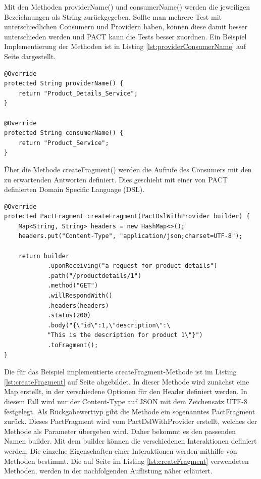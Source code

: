 \documentclass{llncs}
\begin{document}
Mit den Methoden providerName() und consumerName() werden die jeweiligen Bezeichnungen als String zurückgegeben. Sollte man mehrere Test mit unterschiedlichen Consumern und Providern haben, können diese damit besser unterschieden werden und PACT kann die Tests besser zuordnen. Ein Beispiel Implementierung der Methoden ist in Listing \ref{lst:providerConsumerName} auf Seite  \pageref{lst:providerConsumerName} dargestellt.
\lstset{language = Java}
\begin{lstlisting}[caption=Implementierung von providerName() und consumerName(),label=lst:providerConsumerName]
@Override
protected String providerName() {
    return "Product_Details_Service";
}

@Override
protected String consumerName() {
    return "Product_Service";
}
\end{lstlisting}

Über die Methode createFragment() werden die Aufrufe des Consumers mit den zu erwartenden Antworten definiert. Dies geschieht mit einer von PACT definierten Domain Specific Language (DSL).
\lstset{language = Java}
\begin{lstlisting}[caption=Implementierung createFragment(),label=lst:createFragment]
@Override
protected PactFragment createFragment(PactDslWithProvider builder) {
    Map<String, String> headers = new HashMap<>();
    headers.put("Content-Type", "application/json;charset=UTF-8");
        
    return builder
            .uponReceiving("a request for product details")
            .path("/productdetails/1")
            .method("GET")
            .willRespondWith()
            .headers(headers)
            .status(200)
            .body("{\"id\":1,\"description\":\
            "This is the description for product 1\"}")
            .toFragment();
}
\end{lstlisting}
Die für das Beispiel implementierte createFragment-Methode ist im Listing \ref{lst:createFragment} auf Seite \pageref{lst:createFragment} abgebildet. In dieser Methode wird zunächst eine Map erstellt, in der verschiedene Optionen für den Header definiert werden. In diesem Fall wird nur der Content-Type auf JSON mit dem Zeichensatz UTF-8 festgelegt. Als Rückgabewerttyp gibt die Methode ein sogenanntes PactFragment zurück. Dieses PactFragment wird vom PactDslWithProvider erstellt, welches der Methode als Parameter übergeben wird. Daher bekommt es den passenden Namen builder. Mit dem builder können die verschiedenen Interaktionen definiert werden. Die einzelne Eigenschaften einer Interaktionen werden mithilfe von Methoden bestimmt. Die auf Seite \pageref{lst:createFragment} im Listing \ref{lst:createFragment} verwendeten Methoden, werden in der nachfolgenden Auflistung näher erläutert. 
\end{document}
